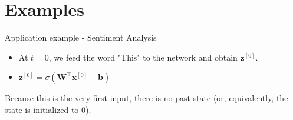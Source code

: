 \section{Examples}


\begin{frame} {Application example - Sentiment Analysis}
  \begin{itemize}
    \item At $t = 0$, we feed the word "This" to the network and obtain $\mathbf{z}^{[0]}$.
    \item $\mathbf{z}^{[0]} = \sigma(\mathbf{W}^\top \mathbf{x}^{[0]} + \mathbf{b})$
  \end{itemize}
  \begin{figure}
      \centering
  \end{figure}
  Because this is the very first input, there is no past state (or, equivalently, the state is initialized to 0).
\end{frame}

